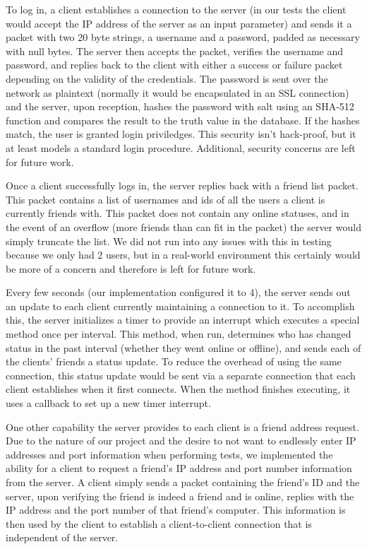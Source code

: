 To log in, a client establishes a connection to the server (in our tests
the client would accept the IP address of the server as an input parameter) and sends it
a packet with two 20 byte strings, a username and a password, padded as necessary with
null bytes. The server then accepts the packet, verifies the username and password, and
replies back to the client with either a success or failure packet depending on the
validity of the credentials. The password is sent over the network as plaintext (normally
it would be encapsulated in an SSL connection) and the server, upon reception, hashes
the password with salt using an SHA-512 function and compares the result to the truth value 
in the database. If the hashes match, the user is granted login priviledges. This
security isn't hack-proof, but it at least models a standard login procedure.  Additional,
security concerns are left for future work.

Once a client successfully logs in, the server replies back with a friend list packet.
This packet contains a list of usernames and ids of all the users a client is currently
friends with. This packet does not contain any online statuses, and in the event of
an overflow (more friends than can fit in the packet) the server would simply truncate
the list. We did not run into any issues with this in testing because we only had 2
users, but in a real-world environment this certainly would be more of a concern and 
therefore is left for future work.

Every few seconds (our implementation configured it to 4), the server sends out an
update to each client currently maintaining a connection to it. To accomplish this,
the server initializes a timer to provide an interrupt which executes a special method
once per interval. This method, when run, determines who has changed status in the past
interval (whether they went online or offline), and sends each of the clients' friends a 
status update. To reduce the overhead of using the same
connection, this status update would be sent via a separate connection that each client
establishes when it first connects. When the method finishes executing, it uses a callback
to set up a new timer interrupt. 

One other capability the server provides to each client is a friend address request. Due to
the nature of our project and the desire to not want to endlessly enter IP addresses and
port information
when performing tests, we implemented the ability for a client to request a friend's IP 
address and port number
information from the server. A client simply sends a packet containing the friend's ID and 
the server, upon verifying the friend is indeed a friend and is online, replies with the
IP address and the port number of that friend's computer. This information is then used
by the client to establish a client-to-client connection that is independent of the 
server.

